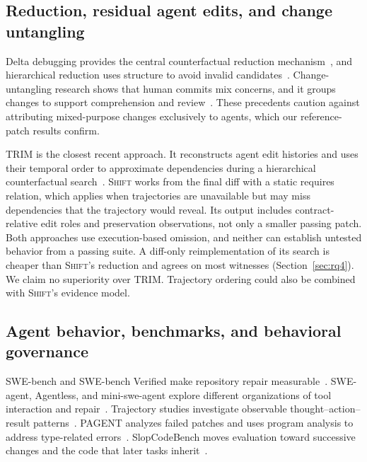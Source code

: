 \documentclass[a4paper,fleqn]{cas-sc}
\newcommand{\tool}{\textsc{Shift}}
\begin{document}
\subsection{Reduction, residual agent edits, and change untangling}

Delta debugging provides the central counterfactual reduction mechanism~\citep{zeller1999yesterday,zeller2002ddmin}, and hierarchical reduction uses structure to avoid invalid candidates~\citep{misherghi2006hdd}. Change-untangling research shows that human commits mix concerns, and it groups changes to support comprehension and review~\citep{herzig2013tangled,barnett2015untangle,dias2015untangling}. These precedents caution against attributing mixed-purpose changes exclusively to agents, which our reference-patch results confirm.

TRIM is the closest recent approach. It reconstructs agent edit histories and uses their temporal order to approximate dependencies during a hierarchical counterfactual search~\citep{mathai2026trim}. \tool{} works from the final diff with a static requires relation, which applies when trajectories are unavailable but may miss dependencies that the trajectory would reveal. Its output includes contract-relative edit roles and preservation observations, not only a smaller passing patch. Both approaches use execution-based omission, and neither can establish untested behavior from a passing suite. A diff-only reimplementation of its search is cheaper than \tool{}'s reduction and agrees on most witnesses (Section~\ref{sec:rq4}). We claim no superiority over TRIM. Trajectory ordering could also be combined with \tool{}'s evidence model.

\subsection{Agent behavior, benchmarks, and behavioral governance}

SWE-bench and SWE-bench Verified make repository repair measurable~\citep{jimenez2024swebench,chowdhury2024verified}. SWE-agent, Agentless, and mini-swe-agent explore different organizations of tool interaction and repair~\citep{yang2024sweagent,xia2025agentless,miniswe2025}. Trajectory studies investigate observable thought--action--result patterns~\citep{bouzenia2025trajectories}. PAGENT analyzes failed patches and uses program analysis to address type-related errors~\citep{xue2025pagent}. SlopCodeBench moves evaluation toward successive changes and the code that later tasks inherit~\citep{orlanski2026slopcodebench}.
\end{document}
